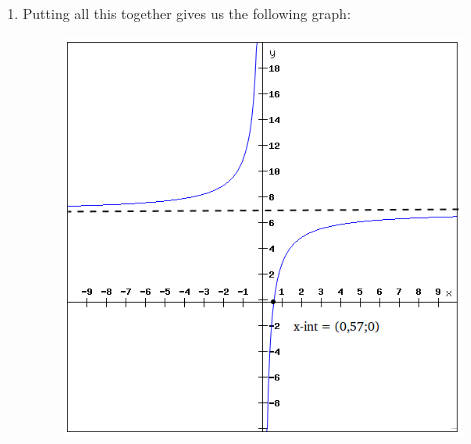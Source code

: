 {\begin{mdframed}[linewidth=4, leftmargin=40, rightmargin=40]
\begin{exercise}
\begin{enumerate}[noitemsep, label=\textbf{Step} \textbf{\arabic*}. ]
{\begin{equation}
      \end{equation}
    }{%
    \setlength{\mymathboxwidth}{\columnwidth}
      \addtolength{\mymathboxwidth}{-48pt}
    \par\vspace{12pt}\noindent\begin{minipage}{\columnwidth}
    \parbox[t]{\mymathboxwidth}{\large$
    y=\frac{-4}{x}+70=\frac{-4}{x}+7-7=\frac{-4}{x}{x}_{\mathrm{int}}=\frac{4}{7}$}\hfill
    \parbox[t]{48pt}{\raggedleft 
    (1.33)}
    \end{minipage}\vspace{12pt}\par
    }%
So there is one x-intercept at $\left(\frac{4}{7},0\right)$.\item Putting all this together gives us the following graph:
    \setcounter{subfigure}{0}
	\begin{figure}[H] %
    \begin{center}
    \label{m39341*uid12479!!!underscore!!!media}\label{m39341*uid12479!!!underscore!!!printimage}\includegraphics[width=.6\columnwidth]{col11306.imgs/m39341_hyperbola1.png} %
      \vspace{2pt}
    \vspace{.1in}
    \end{center}
 \end{figure}       
\end{enumerate}
    \end{exercise}
    \end{mdframed}
    }
    \noindent
\label{m39341*secfhsst!!!underscore!!!id3460}

